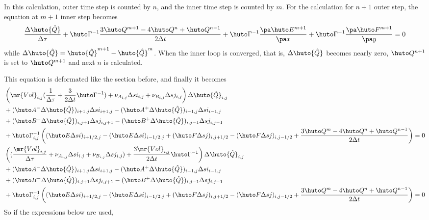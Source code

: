 \documentclass{jsarticle}
\newcommand{\bQ}{\huto Q}
\newcommand{\bhQ}{\huto{\hat Q}}
\newcommand{\bE}{\huto E}
\newcommand{\bF}{\huto F}
\newcommand{\bA}{\huto A}
\newcommand{\bB}{\huto B}
\newcommand{\bG}{\huto \Gamma}
\newcommand{\Vol}{\mr{Vol}}
\begin{document}
In this calculation, outer time step is counted by $n$, and the inner time step is counted by $m$. For the calculation for $n+1$ outer step, the equation at $m+1$ inner step becomes
\begin{equation}
\frac{\Delta \bhQ}{\Delta \tau} + \bG ^{-1}\frac{3\bQ^{m+1}-4\bQ^{n}+\bQ^{n-1}}{2\Delta t} + \bG ^{-1}\frac{\pa \bE^{m+1}}{\pa x} + \bG ^{-1}\frac{\pa \bF^{m+1}}{\pa y} = 0
\end{equation}
while $\Delta \bhQ = \bhQ^{m+1}-\bhQ^m$. When the inner loop is converged, that is, $\Delta \bhQ$ becomes nearly zero, $\bQ^{n+1}$ is set to $\bQ^{m+1}$ and next $n$ is calculated.

This equation is deformated like the section before, and finally it becomes
\begin{gather}
\begin{split}
&\left( \Vol _{i,j}(\frac{1}{\Delta \tau} +\frac{3}{2\Delta t}\bG ^{-1})+ \nu _{A_{i,j}}\Delta si_{i,j} + \nu _{B_{i,j  }}\Delta sj_{i,j  }\right) \Delta \bhQ _{i,j}\\
&+ (\bA^-\Delta \bhQ)_{i+1,j}\Delta si_{i+1,j} - (\bA^+\Delta \bhQ)_{i-1,j}\Delta si_{i-1,j}\\
&+ (\bB^-\Delta \bhQ)_{i,j+1}\Delta sj_{i,j+1} - (\bB^+\Delta \bhQ)_{i,j-1}\Delta sj_{i,j-1}\\
&+ \bG ^{-1} _{i,j} \left( (\bE \Delta si)_{i+1/2,j} - (\bE \Delta si)_{i-1/2,j}+  (\bF \Delta sj)_{i,j+1/2} - (\bF \Delta sj)_{i,j-1/2}+ \frac{3\bQ^m-4\bQ^n+\bQ^{n-1}}{2\Delta t}\right) =0
\end{split}\\
\begin{split}
&\left( (\frac{\Vol _{i,j}}{\Delta \tau}+ \nu _{A_{i,j}}\Delta si_{i,j} + \nu _{B_{i,j}}\Delta sj_{i,j}) +\frac{3\Vol _{i,j}}{2\Delta t}\bG ^{-1}\right) \Delta \bhQ _{i,j}\\
&+ (\bA^-\Delta \bhQ)_{i+1,j}\Delta si_{i+1,j} - (\bA^+\Delta \bhQ)_{i-1,j}\Delta si_{i-1,j}\\
&+ (\bB^-\Delta \bhQ)_{i,j+1}\Delta sj_{i,j+1} - (\bB^+\Delta \bhQ)_{i,j-1}\Delta sj_{i,j-1}\\
&+ \bG ^{-1} _{i,j} \left( (\bE \Delta si)_{i+1/2,j} - (\bE \Delta si)_{i-1/2,j}+  (\bF \Delta sj)_{i,j+1/2} - (\bF \Delta sj)_{i,j-1/2}+\frac{3\bQ^m-4\bQ^n+\bQ^{n-1}}{2\Delta t}\right) =0
\end{split}
\end{gather}
So if the expressions below are used,
\end{document}
